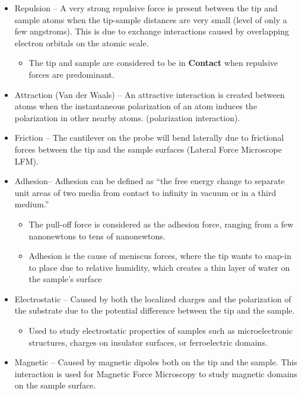 \documentclass{../lab}
\begin{document}
    \begin{itemize}
        \item Repulsion -- A very strong repulsive force is present between the tip and sample atoms when the tip-sample distances are very small (level of only a few angstroms).  This is due to exchange interactions caused by overlapping electron orbitals on the atomic scale.

        \begin{itemize}
            \item The tip and sample are considered to be in \textbf{Contact} when repulsive forces are predominant.

        \end{itemize}

        \item Attraction (Van der Waals) -- An attractive interaction is created between atoms when the instantaneous polarization of an atom induces the polarization in other nearby atoms. (polarization interaction).

        \item Friction -- The cantilever on the probe will bend laterally due to frictional forces between the tip and the sample surfaces (Lateral Force Microscope LFM).

        \item Adhesion-- Adhesion can be defined as ``the free energy change to separate unit areas of two media from contact to infinity in vacuum or in a third medium.''

        \begin{itemize}
            \item The pull-off force is considered as the adhesion force, ranging from a few nanonewtons to tens of nanonewtons.

            \item Adhesion is the cause of meniscus forces, where the tip wants to snap-in to place due to relative humidity, which creates a thin layer of water on the sample's surface
        \end{itemize}

        \item Electrostatic -- Caused by both the localized charges and the polarization of the substrate due to the potential difference between the tip and the sample.

        \begin{itemize}
            \item Used to study electrostatic properties of samples such as microelectronic structures, charges on insulator surfaces, or ferroelectric domains.
        \end{itemize}

        \item Magnetic -- Caused by magnetic dipoles both on the tip and the sample. This interaction is used for Magnetic Force Microscopy to study magnetic domains on the sample surface.

    \end{itemize}
\end{document}
